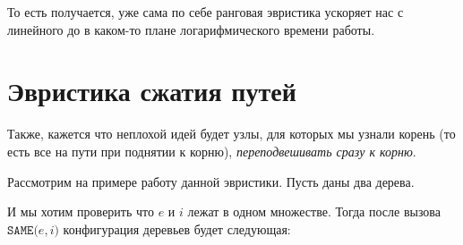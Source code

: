 То есть получается, уже сама по себе ранговая эвристика ускоряет нас с линейного до в каком-то плане логарифмического времени работы.

\section{Эвристика сжатия путей}

Также, кажется что неплохой идей будет узлы, для которых мы узнали корень (то есть все на пути при поднятии к корню), \textit{переподвешивать сразу к корню}.

Рассмотрим на примере работу данной эвристики. Пусть даны два дерева.

\begin{figure}[H]
    \centering
\end{figure}

И мы хотим проверить что $e$ и $i$ лежат в одном множестве. Тогда после вызова $\texttt{SAME(}e, i\texttt{)}$ конфигурация деревьев будет следующая:

